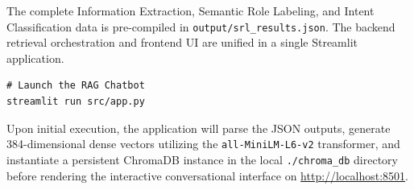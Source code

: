 \documentclass[twoside,final]{hcmut-report}
\begin{document}
The complete Information Extraction, Semantic Role Labeling, and Intent Classification data is pre-compiled in \texttt{output/srl\_results.json}. The backend retrieval orchestration and frontend UI are unified in a single Streamlit application.

\begin{verbatim}
# Launch the RAG Chatbot
streamlit run src/app.py
\end{verbatim}

Upon initial execution, the application will parse the JSON outputs, generate 384-dimensional dense vectors utilizing the \texttt{all-MiniLM-L6-v2} transformer, and instantiate a persistent ChromaDB instance in the local \texttt{./chroma\_db} directory before rendering the interactive conversational interface on \url{http://localhost:8501}.

% 
% 
\end{document}
